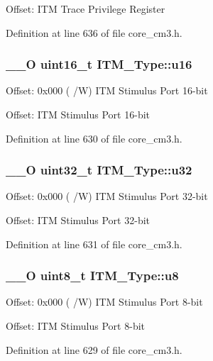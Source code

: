 Offset\-: I\-T\-M Trace Privilege Register 

Definition at line 636 of file core\-\_\-cm3.\-h.

\hypertarget{struct_i_t_m___type_a12aa4eb4d9dcb589a5d953c836f4e8f4}{
\subsubsection[{u16}]{\setlength{\rightskip}{0pt plus 5cm}\-\_\-\-\_\-\-O {\bf uint16\-\_\-t} I\-T\-M\-\_\-\-Type\-::u16}}\label{struct_i_t_m___type_a12aa4eb4d9dcb589a5d953c836f4e8f4}
Offset\-: 0x000 ( /\-W) I\-T\-M Stimulus Port 16-\/bit

Offset\-: I\-T\-M Stimulus Port 16-\/bit 

Definition at line 630 of file core\-\_\-cm3.\-h.

\hypertarget{struct_i_t_m___type_a6882fa5af67ef5c5dfb433b3b68939df}{
\subsubsection[{u32}]{\setlength{\rightskip}{0pt plus 5cm}\-\_\-\-\_\-\-O {\bf uint32\-\_\-t} I\-T\-M\-\_\-\-Type\-::u32}}\label{struct_i_t_m___type_a6882fa5af67ef5c5dfb433b3b68939df}
Offset\-: 0x000 ( /\-W) I\-T\-M Stimulus Port 32-\/bit

Offset\-: I\-T\-M Stimulus Port 32-\/bit 

Definition at line 631 of file core\-\_\-cm3.\-h.

\hypertarget{struct_i_t_m___type_abea77b06775d325e5f6f46203f582433}{
\subsubsection[{u8}]{\setlength{\rightskip}{0pt plus 5cm}\-\_\-\-\_\-\-O {\bf uint8\-\_\-t} I\-T\-M\-\_\-\-Type\-::u8}}\label{struct_i_t_m___type_abea77b06775d325e5f6f46203f582433}
Offset\-: 0x000 ( /\-W) I\-T\-M Stimulus Port 8-\/bit

Offset\-: I\-T\-M Stimulus Port 8-\/bit 

Definition at line 629 of file core\-\_\-cm3.\-h.



